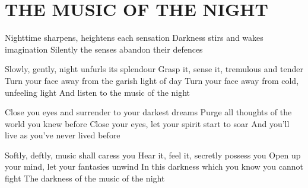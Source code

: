 \documentclass[../../../songbook.tex]{subfiles}
\begin{document}
\TabPositions{9cm} %
\section*{THE MUSIC OF THE NIGHT}
{}
\vspace{0.5cm}
Nighttime sharpens, heightens each sensation	 \newline
Darkness stirs and wakes imagination			 \newline
Silently the senses abandon their defences		 \newline

Slowly, gently, night unfurls its splendour			 \newline
Grasp it, sense it, tremulous and tender			 \newline
Turn your face away from the garish light of day	 \newline
Turn your face away from cold, unfeeling light		 \newline
And listen to the music of the night				 \newline

\-\hspace{0.5cm} Close you eyes and surrender to your darkest dreams	 \newline
\-\hspace{0.5cm} Purge all thoughts of the world you knew before       \newline
\-\hspace{0.5cm} Close your eyes, let your spirit start to soar        \newline
\-\hspace{0.5cm} And you'll live as you've never lived before          \newline

Softly, deftly, music shall caress you				 \newline
Hear it, feel it, secretly possess you				 \newline
Open up your mind, let your fantasies unwind		 \newline
In this darkness which you know you cannot fight	 \newline
The darkness of the music of the night				 \newline
\end{document}
